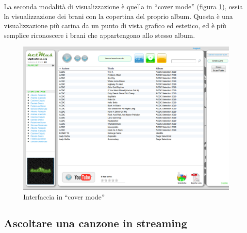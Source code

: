 La seconda modalit\`a di visualizzazione \`e quella in ``cover mode'' (figura
\ref{fig:coverMode}), ossia la visualizzazione dei brani con la copertina del
proprio album. Questa \`e una visualizzazione pi\`u carina da un punto di vista grafico ed estetico, ed \`e
pi\`u semplice riconoscere i brani che appartengono allo stesso album.\\

\begin{figure}[!htbp]
  \centering
  \includegraphics[width=14cm]{img/MU/song_loaded.png}
\caption{Interfaccia in ``cover mode''}
\label{fig:coverMode}
\end{figure}

\subsection{Ascoltare una canzone in streaming}

